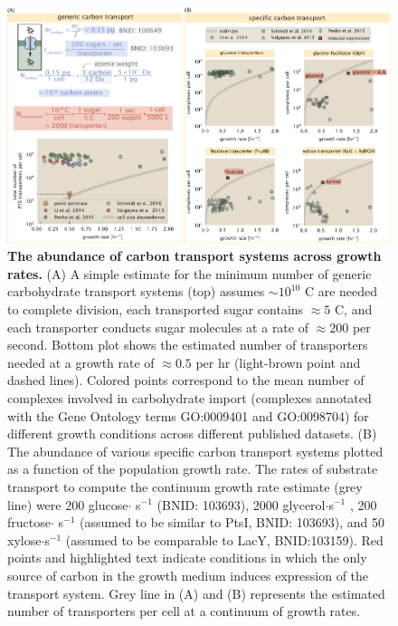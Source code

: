 \begin{figure}
    \begin{fullwidth}
    \includegraphics{main_figs/fig2_carbon_transport.pdf}
    \caption{\textbf{The abundance of carbon transport systems across growth
    rates.} (A) A simple estimate for the minimum number of generic carbohydrate
    transport systems (top) assumes $\sim 10^{10}$ C are needed to complete
    division, each transported sugar contains $\approx 5$ C, and each
    transporter conducts sugar molecules at a rate of $\approx 200$ per second.
    Bottom plot shows the estimated number of transporters needed at a growth
    rate of $\approx 0.5 $ per hr (light-brown point and dashed lines).  Colored
    points correspond to the mean number of complexes involved in carbohydrate
    import (complexes annotated with the Gene Ontology terms GO:0009401 and
    GO:0098704) for different growth conditions across different published
    datasets. (B) The abundance of various specific carbon transport systems
    plotted as a function of the population growth rate. The rates of substrate
    transport to compute the continuum growth rate estimate (grey line) were 200
    glucose$\cdot$ s$^{-1}$ (BNID: 103693),  2000 glycerol$\cdot$s$^{-1}$
    \citep{lu2003}, 200 fructose$\cdot$ s$^{-1}$ (assumed to be similar to PtsI,
    BNID: 103693), and 50 xylose$\cdot$s$^{-1}$ (assumed to be comparable to
    LacY, BNID:103159). Red points and highlighted text indicate conditions in
    which the only source of carbon in the growth medium induces expression of
    the transport system. Grey line in (A) and (B) represents the estimated
    number of transporters per cell at a continuum of growth
    rates.}\label{fig:carbon_tport} 
\end{fullwidth}
\end{figure}
